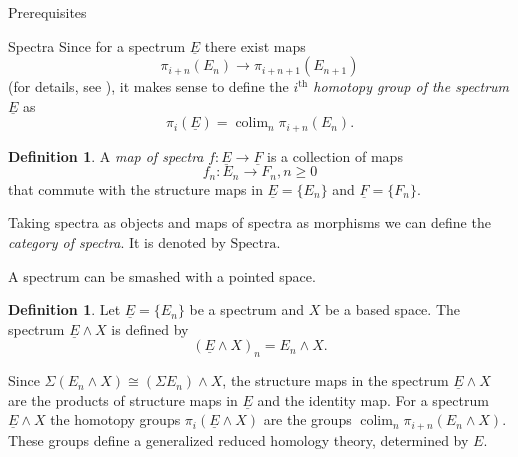 \documentclass[12pt]{amsart}
\newcommand{\colim}{\operatorname{colim}}
\theoremstyle{plain}
\theoremstyle{definition}
\newtheorem{defin}[thm]{Definition}
\newtheorem{example}[thm]{Example}
\theoremstyle{remark}
\begin{document}
\begin{section}{Prerequisites}
\begin{subsection}{Spectra}
Since for a spectrum $\underline{E}$ there exist maps $$\pi_{i+n}(E_n) \rightarrow \pi_{i+n+1}(E_{n+1})$$ (for details, see \cite[Section 4.F]{Hatcher}), it makes sense to define the \textit{$i^{\text{th}}$ homotopy group of the spectrum} $\underline{E}$ as
$$\pi_i(\underline{E})=\colim_n \pi_{i+n} (E_n).$$

\begin{defin}
A \textit{map of spectra} $f: \underline{E} \rightarrow \underline{F}$ is a collection of maps $$f_n: E_n \rightarrow F_n, n \geq 0$$
that commute with the structure maps in $\underline{E}=\{E_n\}$ and $\underline{F}=\{F_n\}$.
\end{defin}
Taking spectra as objects and maps of spectra as morphisms we can define the \textit{category of spectra}. It is denoted by $\text{Spectra}$.



A spectrum can be smashed with a pointed space.
\begin{defin}
Let $\underline{E}=\{E_n\}$ be a spectrum and $X$ be a based space. The spectrum $\underline{E} \wedge X$ is defined by $$(\underline{E} \wedge X)_n=E_n \wedge X.$$
\end{defin}
Since $\Sigma(E_n \wedge X)\cong(\Sigma E_n) \wedge X$, the structure maps in the spectrum $\underline{E} \wedge X$  are the products of structure maps in $\underline{E}$ and the identity map.
For a spectrum $\underline{E} \wedge X$ the homotopy groups $\pi_i(\underline{E}\wedge X)$ are the groups $\colim_n \pi_{i+n} (E_n \wedge X)$. These groups define a generalized reduced homology theory, determined by $E$.


\end{subsection}
\end{section}
\end{document}
